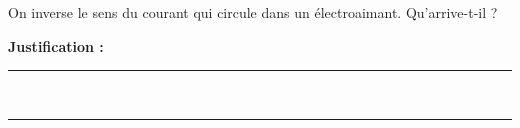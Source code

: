 On inverse le sens du courant qui circule dans un électroaimant. Qu'arrive-t-il ?

\choices

\noindent\textbf{Justification :} \hrulefill \\[2.5ex]
\rule{\linewidth}{0.4pt} \\[2.5ex]
\rule{\linewidth}{0.4pt}
\vfill
